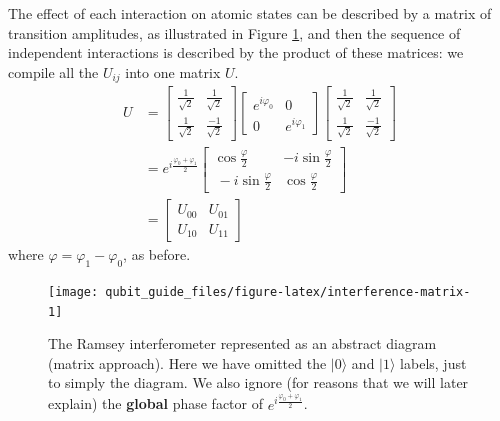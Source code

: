 \documentclass[fleqn,a4paper]{article}
\theoremstyle{definition}
\theoremstyle{definition}
\theoremstyle{definition}
\theoremstyle{definition}
\theoremstyle{remark}
\begin{document}
The effect of each interaction on atomic states can be described by a matrix of transition amplitudes, as illustrated in Figure \ref{fig:interference-matrix}, and then the sequence of independent interactions is described by the product of these matrices: we compile all the \(U_{ij}\) into one matrix \(U\).
\[
  \begin{aligned}
    U &=
    \begin{bmatrix}
      \frac{1}{\sqrt{2}} & \frac{1}{\sqrt{2}}
    \\\frac{1}{\sqrt{2}} & \frac{-1}{\sqrt{2}}
    \end{bmatrix}
    \begin{bmatrix}
      e^{i\varphi_0} & 0
    \\0 & e^{i\varphi_1}
    \end{bmatrix}
    \begin{bmatrix}
      \frac{1}{\sqrt{2}} & \frac{1}{\sqrt{2}}
    \\\frac{1}{\sqrt{2}} & \frac{-1}{\sqrt{2}}
    \end{bmatrix}
  \\&= e^{i\frac{\varphi_0+\varphi_1}{2}}
    \begin{bmatrix}
      \cos\frac{\varphi}{2} & -i\sin\frac{\varphi}{2}
    \\\ -i\sin\frac{\varphi}{2}& \cos\frac{\varphi}{2}
    \end{bmatrix}
  \\&=
    \begin{bmatrix}
      U_{00} & U_{01}
    \\U_{10} & U_{11}
    \end{bmatrix}
  \end{aligned}
\]
where \(\varphi = \varphi_1-\varphi_0\), as before.



\begin{figure}[H]

{\centering \texttt{[image: qubit\_guide\_files/figure-latex/interference-matrix-1]} 

}

\caption{The Ramsey interferometer represented as an abstract diagram (matrix approach). Here we have omitted the \(|0\rangle\) and \(|1\rangle\) labels, just to simply the diagram. We also ignore (for reasons that we will later explain) the \textbf{global} phase factor of \(e^{i\frac{\varphi_0+\varphi_1}{2}}\).}\label{fig:interference-matrix}
\end{figure}
\end{document}
